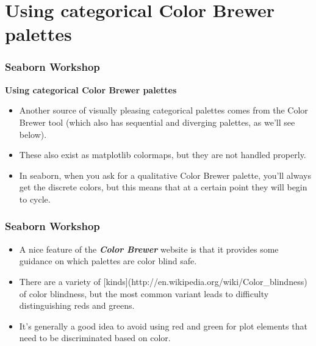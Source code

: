 \documentclass{beamer}
\begin{document}
\section{Using categorical Color Brewer palettes}
\begin{frame}[fragile]
	\frametitle{Seaborn Workshop}
	\large
\textbf{Using categorical Color Brewer palettes}
\begin{itemize}
\item Another source of visually pleasing categorical palettes comes from the Color Brewer tool (which also has sequential and diverging palettes, as we’ll see below). 
\item These also exist as matplotlib colormaps, but they are not handled properly. 
\item In seaborn, when you ask for a qualitative Color Brewer palette, you’ll always get the discrete colors, but this means that at a certain point they will begin to cycle.
\end{itemize}

\end{frame}
\begin{frame}[fragile]
	\frametitle{Seaborn Workshop}
	\large
	\begin{itemize}
\item A nice feature of the \textbf{\textit{Color Brewer}} website is that it provides some guidance on which palettes are color blind safe. 
\item There are a variety of [kinds](http://en.wikipedia.org/wiki/Color\_blindness) of color blindness, but the most common variant leads to difficulty distinguishing reds and greens.
\item It’s generally a good idea to avoid using red and green for plot elements that need to be discriminated based on color.
\end{itemize}
\end{frame}
\end{document}
